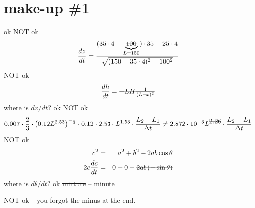 \documentclass[10pt]{article} %
\begin{document}
\section*{make-up \#1}
ok
NOT ok
\begin{equation*}
	\frac{dz}{dt}=\frac{(35\cdot4-\underbrace{\mbox{\sout{100}}}_{L=150})
	\cdot35+25\cdot4}{\sqrt{(150-35\cdot4)^2+100^2}}
\end{equation*}
NOT ok
\begin{equation*}
	\frac{dh}{dt}=\mbox{\sout{$-LH\frac{1}{(L-x)^2}$}}
\end{equation*}
where is $dx/dt$?
ok
NOT ok
\begin{equation*}
	0.007\cdot\frac{2}{3}\cdot\left( 0.12L^{2.53} \right)^{-\frac{1}{3}}
	\cdot0.12\cdot2.53\cdot L^{1.53}\cdot\frac{L_2-L_1}{\Delta t}
	\neq 2.872\cdot10^{-3}
	L^{\mbox{\sout{2.26}}}
	\cdot\frac{L_2-L_1}{\Delta t}
\end{equation*}
NOT ok
\begin{align*}
	c^2&=& a^2+b^2-2ab\cos\theta\\
	2c\frac{dc}{dt}&=& 0+0-\mbox{\sout{$2ab\left( -\sin\theta \right)$}}
\end{align*}
where is $d\theta/dt$?
ok
\sout{mintute} -- minute

NOT ok -- you forgot the minus at the end.
\end{document}
